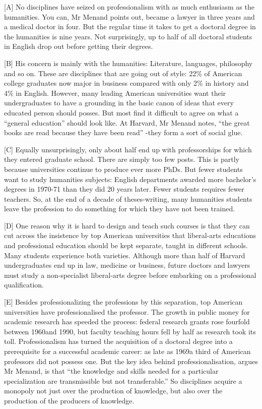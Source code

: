 [A] No disciplines have seized on professionalism with as much enthusiasm as the humanities. You can, Mr Menand points out, became a lawyer in three years and a medical doctor in four. But the regular time it takes to get a doctoral degree in the humanities is nine years. Not surprisingly, up to half of all doctoral students in English drop out before getting their degrees.

[B] His concern is mainly with the humanities: Literature, languages, philosophy and so on. These are disciplines that are going out of style: 22\% of American college graduates now major in business compared with only 2\% in history and 4\% in English. However, many leading American universities want their undergraduates to have a grounding in the basic canon of ideas that every educated person should posses. But most find it difficult to agree on what a ``general education'' should look like. At Harvard, Mr Menand notes, ``the great books are read because they have been read'' -they form a sort of social glue. 

[C] Equally unsurprisingly, only about half end up with professorships for which they entered graduate school. There are simply too few posts. This is partly because universities continue to produce ever more PhDs. But fewer students want to study humanities subjects: English departments awarded more bachelor’s degrees in 1970-71 than they did 20 years later. Fewer students requires fewer teachers. So, at the end of a decade of theses-writing, many humanities students leave the profession to do something for which they have not been trained.

[D] One reason why it is hard to design and teach such courses is that they can cut across the insistence by top American universities that liberal-arts educations and professional education should be kept separate, taught in different schools. Many students experience both varieties. Although more than half of Harvard undergraduates end up in law, medicine or business, future doctors and lawyers must study a non-specialist liberal-arts degree before embarking on a professional qualification.

[E] Besides professionalizing the professions by this separation, top American universities have professionalised the professor. The growth in public money for academic research has speeded the process: federal research grants rose fourfold between 1960and 1990, but faculty teaching hours fell by half as research took its toll. Professionalism has turned the acquisition of a doctoral degree into a prerequisite for a successful academic career: as late as 1969a third of American professors did not possess one. But the key idea behind professionalisation, argues Mr Menand, is that ``the knowledge and skills needed for a particular specialization are transmissible but not transferable.'' So disciplines acquire a monopoly not just over the production of knowledge, but also over the production of the producers of knowledge.

